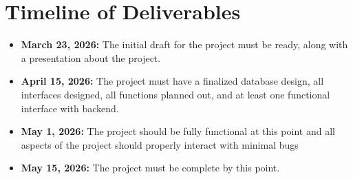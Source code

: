 \documentclass[11pt]{article}
\begin{document}
\section{Timeline of Deliverables}
    \begin{itemize}
        \item \textbf{March 23, 2026:} The initial draft for the project must be ready, along with
        a presentation about the project.
        \item \textbf{April 15, 2026:} The project must have a finalized database design, all interfaces
        designed, all functions planned out, and at least one functional interface with backend.
        \item \textbf{May 1, 2026:} The project should be fully functional at this point and all aspects of the project should 
        properly interact with minimal bugs
        \item \textbf{May 15, 2026:} The project must be complete by this point.
    \end{itemize}
\end{document}
